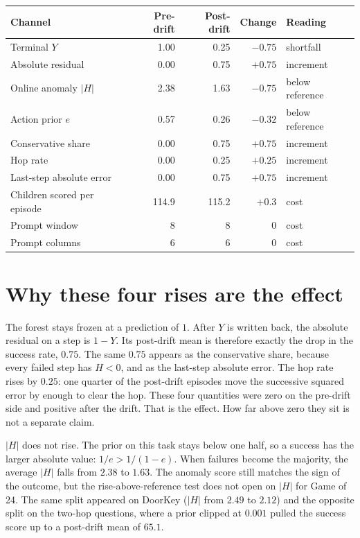\documentclass[11pt,a4paper]{article}
\begin{document}
\begin{center}
\begin{tabular}{lrrrl}
\toprule
Channel & Pre-drift & Post-drift & Change & Reading \\
\midrule
Terminal \(Y\) & 1.00 & 0.25 & \(-0.75\) & shortfall \\
Absolute residual & 0.00 & 0.75 & \(+0.75\) & increment \\
Online anomaly \(|H|\) & 2.38 & 1.63 & \(-0.75\) & below reference \\
Action prior \(e\) & 0.57 & 0.26 & \(-0.32\) & below reference \\
Conservative share & 0.00 & 0.75 & \(+0.75\) & increment \\
Hop rate & 0.00 & 0.25 & \(+0.25\) & increment \\
Last-step absolute error & 0.00 & 0.75 & \(+0.75\) & increment \\
Children scored per episode & 114.9 & 115.2 & \(+0.3\) & cost \\
Prompt window & 8 & 8 & 0 & cost \\
Prompt columns & 6 & 6 & 0 & cost \\
\bottomrule
\end{tabular}
\end{center}

\section{Why these four rises are the effect}
The forest stays frozen at a prediction of \(1\).
After \(Y\) is written back, the absolute residual on a step is \(1-Y\).
Its post-drift mean is therefore exactly the drop in the success rate, \(0.75\).
The same \(0.75\) appears as the conservative share, because every failed step has \(H<0\), and as the last-step absolute error.
The hop rate rises by \(0.25\): one quarter of the post-drift episodes move the successive squared error by enough to clear the hop.
These four quantities were zero on the pre-drift side and positive after the drift.
That is the effect.
How far above zero they sit is not a separate claim.

\(|H|\) does not rise.
The prior on this task stays below one half, so a success has the larger absolute value: \(1/e > 1/(1-e)\).
When failures become the majority, the average \(|H|\) falls from \(2.38\) to \(1.63\).
The anomaly score still matches the sign of the outcome, but the rise-above-reference test does not open on \(|H|\) for Game of 24.
The same split appeared on DoorKey (\(|H|\) from \(2.49\) to \(2.12\)) and the opposite split on the two-hop questions, where a prior clipped at \(0.001\) pulled the success score up to a post-drift mean of \(65.1\).
\end{document}
